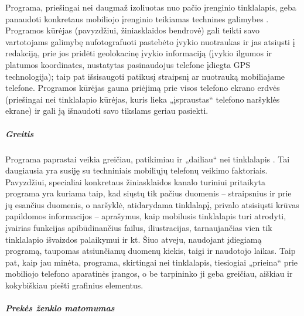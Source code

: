 \documentclass[kursinis-darbas]{vukf}
\begin{document}
Programa, priešingai nei daugmaž izoliuotas nuo pačio įrenginio tinklalapis, geba panaudoti konkretaus mobiliojo įrenginio teikiamas technines galimybes \cite{quirksmode_native_iphone_apps_vs_web_apps}. Programos kūrėjas (pavyzdžiui, žiniasklaidos bendrovė) gali teikti savo vartotojams galimybę nufotografuoti pastebėto įvykio nuotraukas ir jas atsiųsti į redakciją, prie jos pridėti geolokacinę įvykio informaciją (įvykio ilgumos ir platumos koordinates, nustatytas pasinaudojus telefone įdiegta GPS technologija); taip pat išsisaugoti patikusį straipsnį ar nuotrauką mobiliajame telefone. Programos kūrėjas gauna priėjimą prie visos telefono ekrano erdvės (priešingai nei tinklalapio kūrėjas, kuris lieka „įspraustas“ telefono naršyklės ekrane) ir gali ją išnaudoti savo tikslams geriau pasiekti.

\subparagraph{Greitis}

Programa paprastai veikia greičiau, patikimiau ir „dailiau“ nei tinklalapis \cite{quirksmode_native_iphone_apps_vs_web_apps}. Tai daugiausia yra susiję su techniniais mobiliųjų telefonų veikimo faktoriais. Pavyzdžiui, specialiai konkretaus žiniasklaidos kanalo turiniui pritaikyta programa yra kuriama taip, kad siųstų tik pačius duomenis – straipsnius ir prie jų esančius duomenis, o naršyklė, atidarydama tinklalapį, privalo atsisiųsti krūvas papildomos informacijos – aprašymus, kaip mobilusis tinklalapis turi atrodyti, įvairias funkcijas apibūdinančius failus, iliustracijas, tarnaujančias vien tik tinklalapio išvaizdos palaikymui ir kt. Šiuo atveju, naudojant įdiegiamą programą, taupomas atsiunčiamų duomenų kiekis, taigi ir naudotojo laikas. Taip pat, kaip jau minėta, programa, skirtingai nei tinklalapis, tiesiogiai „prieina“ prie mobiliojo telefono aparatinės įrangos, o be tarpininko ji geba greičiau, aiškiau ir kokybiškiau piešti grafinius elementus.

\subparagraph{Prekės ženklo matomumas}
\end{document}
